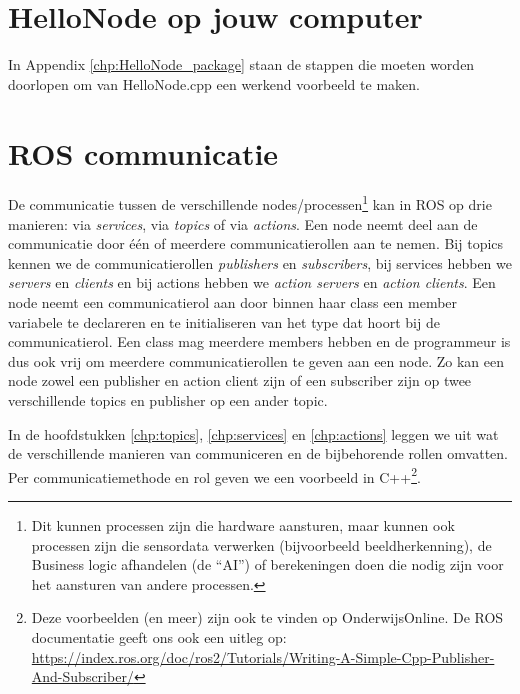 \section{HelloNode op jouw computer}%
In Appendix \ref{chp:HelloNode_package} staan de stappen die moeten worden doorlopen om van HelloNode.cpp een werkend voorbeeld te maken.


\section{ROS communicatie}
De communicatie tussen de verschillende nodes/processen\footnote{Dit kunnen processen zijn die hardware aansturen, maar kunnen ook processen zijn die sensordata verwerken (bijvoorbeeld beeldherkenning), de Business logic afhandelen (de ``AI'') of berekeningen doen die nodig zijn voor het aansturen van andere processen.} kan in ROS op drie manieren: via \textit{services}, via \textit{topics} of via \textit{actions}. Een node neemt deel aan de communicatie door \'e\'en of meerdere communicatierollen aan te nemen. Bij topics kennen we de communicatierollen \textit{publishers} en \textit{subscribers}, bij services hebben we \textit{servers} en \textit{clients} en bij actions hebben we \textit{action servers} en \textit{action clients}. Een node neemt een communicatierol aan door binnen haar class een member variabele te declareren en te initialiseren van het type dat hoort bij de communicatierol. Een class mag meerdere members hebben en de programmeur is dus ook vrij om meerdere communicatierollen te geven aan een node. Zo kan een node zowel een publisher en action client zijn of een subscriber zijn op twee verschillende topics en publisher op een ander topic.

In de hoofdstukken \ref{chp:topics}, \ref{chp:services} en \ref{chp:actions} leggen we uit wat de verschillende manieren van communiceren en de bijbehorende rollen omvatten. Per communicatiemethode en rol geven we een voorbeeld in C++\footnote{Deze voorbeelden (en meer) zijn ook te vinden op OnderwijsOnline. De ROS documentatie geeft ons ook een uitleg op: \url{https://index.ros.org/doc/ros2/Tutorials/Writing-A-Simple-Cpp-Publisher-And-Subscriber/}}. 

